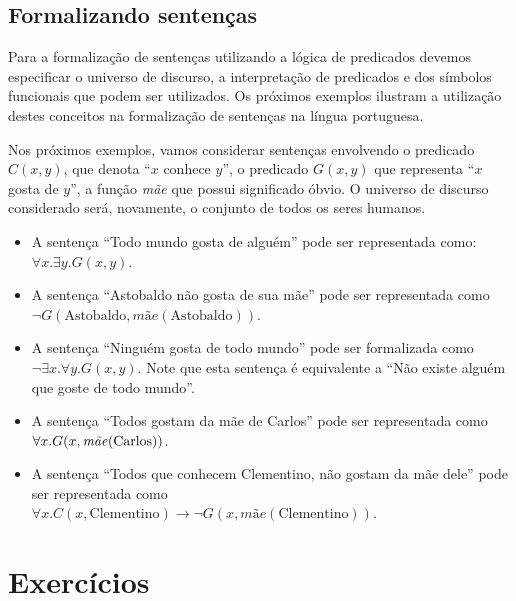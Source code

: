 \subsection{Formalizando sentenças}

Para a formalização de sentenças utilizando a lógica de predicados
devemos especificar o universo de discurso, a interpretação de
predicados e dos símbolos funcionais que podem ser utilizados. Os
próximos exemplos ilustram a utilização destes conceitos na
formalização de sentenças na língua portuguesa.

\begin{Example}
Nos próximos
exemplos, vamos considerar sentenças envolvendo o predicado $C(x,y)$,
que denota ``$x$ conhece $y$'', o predicado $G(x,y)$ que representa
``$x$ gosta de $y$'',  a função \textit{mãe} que possui significado
óbvio. O universo de discurso considerado será, novamente, o conjunto
de todos os seres humanos.
\begin{itemize}
  \item A sentença ``Todo mundo gosta de alguém'' pode ser
    representada como: $\forall x. \exists y. G(x,y)$.
  \item A sentença ``Astobaldo não gosta de sua mãe'' pode ser
    representada como $\neg
    G(\text{Astobaldo},\textit{mãe}(\text{Astobaldo}))$.
  \item A sentença ``Ninguém gosta de todo mundo'' pode ser
    formalizada como $\neg \exists x. \forall y. G(x,y)$. Note que
    esta sentença é equivalente a ``Não existe alguém que goste de
    todo  mundo''.
  \item A sentença ``Todos gostam da mãe de Carlos'' pode ser
    representada como $\forall x. G(x, \text{\textit{mãe}(Carlos))}$.
  \item A sentença ``Todos que conhecem Clementino, não gostam da mãe
    dele'' pode ser representada como $\forall
    x. C(x,\text{Clementino}) \to \neg G(x, \textit{mãe}(\text{Clementino}))$.
\end{itemize}
\end{Example}

\section{Exercícios}

